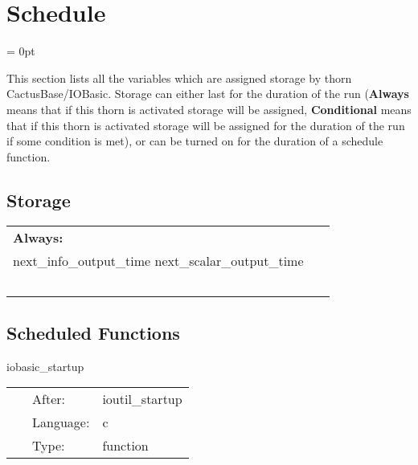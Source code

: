 
\section{Schedule} 


\parskip = 0pt


\noindent This section lists all the variables which are assigned storage by thorn CactusBase/IOBasic.  Storage can either last for the duration of the run ({\bf Always} means that if this thorn is activated storage will be assigned, {\bf Conditional} means that if this thorn is activated storage will be assigned for the duration of the run if some condition is met), or can be turned on for the duration of a schedule function.


\subsection*{Storage}

\hspace{5mm}

 \begin{tabular*}{160mm}{ll} 

{\bf Always:}&  ~ \\ 
 next\_info\_output\_time next\_scalar\_output\_time & ~\\ 
~ & ~\\ 
\end{tabular*} 


\subsection*{Scheduled Functions}
\vspace{5mm}


\hspace{5mm} iobasic\_startup 

\hspace{5mm}{\it startup routine } 


\hspace{5mm}

 \begin{tabular*}{160mm}{cll} 
~ & After:  & ioutil\_startup \\ 
~ & Language:  & c \\ 
~ & Type:  & function \\ 
\end{tabular*} 


\vspace{5mm}

